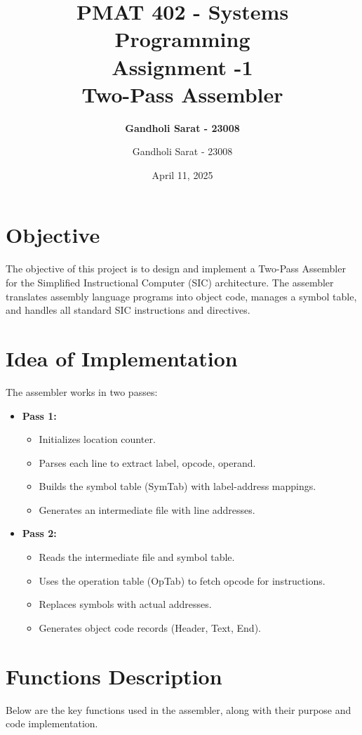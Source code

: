\documentclass[12pt]{article}
\title{\textbf{PMAT 402 - Systems Programming \\ Assignment -1 \\ Two-Pass Assembler}}
\author{\textbf{Gandholi Sarat - 23008}}
\author{Gandholi Sarat - 23008}
\date{April 11, 2025}
\begin{document}
\maketitle

\tableofcontents
\newpage

\section{Objective}
The objective of this project is to design and implement a Two-Pass Assembler for the Simplified Instructional Computer (SIC) architecture. The assembler translates assembly language programs into object code, manages a symbol table, and handles all standard SIC instructions and directives.

\section{Idea of Implementation}
The assembler works in two passes:

\begin{itemize}
    \item \textbf{Pass 1:} 
    \begin{itemize}
        \item Initializes location counter.
        \item Parses each line to extract label, opcode, operand.
        \item Builds the symbol table (SymTab) with label-address mappings.
        \item Generates an intermediate file with line addresses.
    \end{itemize}
    
    \item \textbf{Pass 2:}
    \begin{itemize}
        \item Reads the intermediate file and symbol table.
        \item Uses the operation table (OpTab) to fetch opcode for instructions.
        \item Replaces symbols with actual addresses.
        \item Generates object code records (Header, Text, End).
    \end{itemize}
\end{itemize}

\section{Functions Description}
Below are the key functions used in the assembler, along with their purpose and code implementation.
\end{document}
